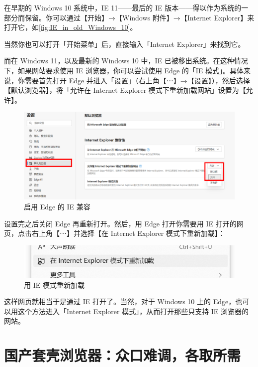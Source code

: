 在早期的 Windows 10 系统中，IE 11——最后的 IE 版本——得以作为系统的一部分而保留。你可以通过【开始】→【Windows 附件】→【Internet Explorer】来打开它，如\autoref{fig:IE_in_old_Windows_10}。

当然你也可以打开「开始菜单」后，直接输入「Internet Explorer」来找到它。

而在 Windows 11，以及最新的 Windows 10 中，IE 已被移出系统。在这种情况下，如果网站要求使用 IE 浏览器，你可以尝试使用 Edge 的「IE 模式」。具体来说，你需要首先打开 Edge 并进入「设置」（右上角【⋯】→【设置】），然后选择【默认浏览器】，将「允许在 Internet Explorer 模式下重新加载网站」设置为【允许】。

\begin{figure}[htb!]
  \centering
  \includegraphics[width=.8\textwidth]{assets/software/Edge_IE_Mode_1.png}
  \caption{启用 Edge 的 IE 兼容}
  \label{fig:Edge_IE_Mode_1}
\end{figure}

设置完之后关闭 Edge 再重新打开。然后，用 Edge 打开你需要用 IE 打开的网页，点击右上角【⋯】并选择【在 Internet Explorer 模式下重新加载】：

\begin{figure}[htb!]
  \centering
  \includegraphics[width=.5\textwidth]{assets/software/Reload_in_IE_mode.png}
  \caption{用 IE 模式重新加载}
  \label{fig:Reload_in_IE_Mode}
\end{figure}

这样网页就相当于是通过 IE 打开了。当然，对于 Windows 10 上的 Edge，也可以用这个方法进入「Internet Explorer 模式」，从而打开那些只支持 IE 浏览器的网站。

\section{国产套壳浏览器：众口难调，各取所需}

